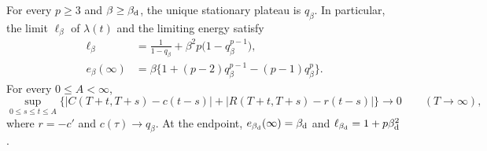 \begin{theorem}\label{sel:selected-sector}
For every $p\ge3$ and $\beta\ge\beta_{\mathrm d}$, the unique stationary plateau is $q_\beta$. In particular, the limit $\ell_\beta$ of $\lambda(t)$ and the limiting energy satisfy
\begin{align}
 \ell_\beta
 &=\frac1{1-q_\beta}+\beta^2p\bigl(1-q_\beta^{p-1}\bigr),
 \label{sel:selected-multiplier}\\
 e_\beta(\infty)
 &=\beta\bigl\{1+(p-2)q_\beta^{p-1}-(p-1)q_\beta^p\bigr\}.
 \label{sel:selected-energy}
\end{align}
For every $0\le A<\infty$,
\begin{equation}
 \sup_{0\le s\le t\le A}
 \bigl\{|C(T+t,T+s)-c(t-s)|+|R(T+t,T+s)-r(t-s)|\bigr\}
 \longrightarrow0\qquad(T\to\infty),
 \label{sel:stationary-window}
\end{equation}
where $r=-c'$ and $c(\tau)\to q_\beta$.
At the endpoint, $e_{\beta_{\mathrm d}}(\infty)=\beta_{\mathrm d}$ and $\ell_{\beta_{\mathrm d}}=1+p\beta_{\mathrm d}^2$.
\end{theorem}

